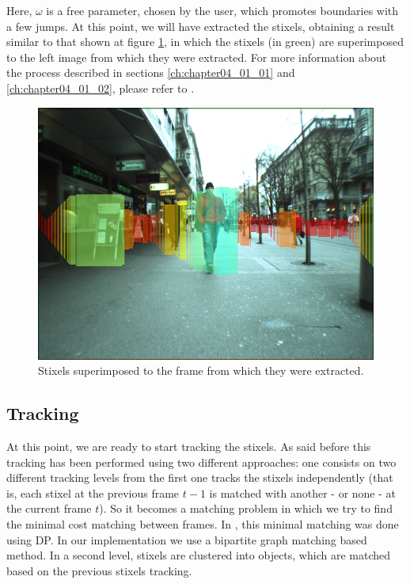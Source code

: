 Here, $\omega$ is a free parameter, chosen by the user, which promotes boundaries with a few jumps. At this point, we will have extracted the stixels, obtaining a result similar to that shown at figure \ref{fig:cp04_stixels}, in which the stixels (in green) are superimposed to the left image from which they were extracted. For more information about the process described in sections \ref{ch:chapter04_01_01} and \ref{ch:chapter04_01_02}, please refer to \cite{benenson2012fast}.

\begin{figure}[h!]
  \centering
  \includegraphics{stixels_over_original}
  \caption{Stixels superimposed to the frame from which they were extracted.}\label{fig:cp04_stixels}
\end{figure}

\subsection{Tracking}\label{ch:chapter04_01_03}

At this point, we are ready to start tracking the stixels. As said before this tracking has been performed using two different approaches: one consists on two different tracking levels from the first one tracks the stixels independently (that is, each stixel at the previous frame $t - 1$ is matched with another - or none - at the current frame $t$). So it becomes a matching problem in which we try to find the minimal cost matching between frames. In \cite{gunyel2012stixels}, this minimal matching was done using \ac{DP}. In our implementation we use a bipartite graph matching based method. In a second level, stixels are clustered into objects, which are matched based on the previous stixels tracking.

